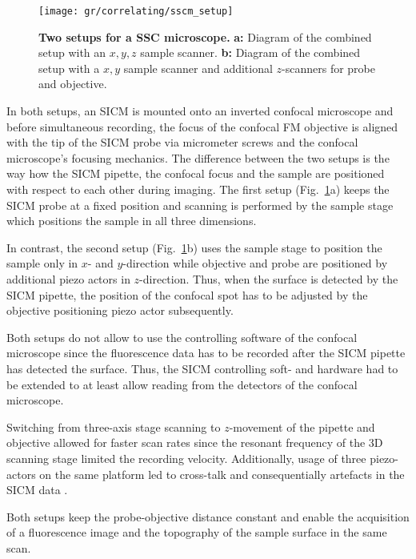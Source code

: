 \begin{figure}
  \centering
  \texttt{[image: gr/correlating/sscm\_setup]}

  \caption{%
    \textbf{Two setups for a SSC microscope.}
    \textbf{a:} Diagram of the combined setup with an $x,y,z$ sample scanner.
    \textbf{b:} Diagram of the combined setup with a $x,y$ sample scanner and
    additional $z$-scanners for probe and objective. 
  }
  \label{fig:sscm_setup}
\end{figure}

In both setups, an SICM is mounted onto an inverted confocal microscope and
before simultaneous recording, the focus of the confocal FM objective is
aligned with the tip of the SICM probe via micrometer screws and the confocal
microscope's focusing mechanics. The
difference between the two setups is the way how the SICM pipette, the
confocal focus and the sample are positioned with respect to each other during
imaging. The
first setup (Fig.~\ref{fig:sscm_setup}a) keeps the 
SICM probe at a fixed position and scanning is performed by the sample
stage which positions the sample in all three dimensions.

In contrast, the second setup (Fig.~\ref{fig:sscm_setup}b) uses the sample
stage to position the sample only in $x$- and $y$-direction while objective
and probe are positioned by additional piezo actors in $z$-direction. Thus,
when the surface is detected by the SICM pipette, the position of the confocal
spot has to be adjusted by the objective positioning piezo actor subsequently.

Both setups do not allow to use the controlling software of the confocal
microscope since the fluorescence data has to be recorded after the SICM
pipette has detected the surface. Thus, the SICM controlling soft- and
hardware had to be extended to at least allow reading from the detectors of
the confocal microscope. 

Switching from three-axis stage scanning to $z$-movement of the pipette and
objective allowed for faster scan rates since the resonant frequency of the 3D
scanning stage limited the recording velocity. Additionally, usage of three
piezo-actors on the same platform led to cross-talk and consequentially
artefacts in the SICM data \cite{Shevchuk2013}.


Both setups keep the probe-objective distance constant and enable the
acquisition of a fluorescence image and the topography of the sample surface in
the same scan.

